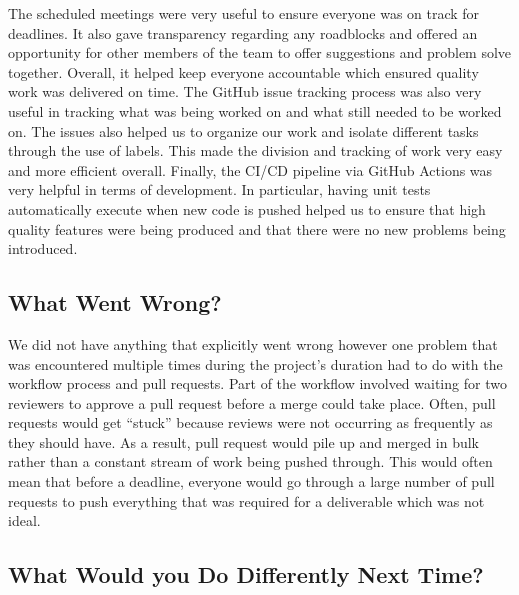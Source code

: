 \documentclass{article}
\begin{document}
The scheduled meetings were very useful to ensure everyone was on track for deadlines.
It also gave transparency regarding any roadblocks and offered an opportunity for other members
of the team to offer suggestions and problem solve together. Overall, it helped keep everyone accountable
which ensured quality work was delivered on time. The GitHub issue tracking process was also very
useful in tracking what was being worked on and what still needed to be worked on. The issues also helped us to organize
our work and isolate different tasks through the use of labels. This made the division and tracking of work
very easy and more efficient overall. Finally, the CI/CD pipeline via GitHub Actions was very helpful in terms
of development. In particular, having unit tests automatically execute when new code is
pushed helped us to ensure that high quality features were being produced and that there were no new problems being introduced.

\subsection{What Went Wrong?}


We did not have anything that explicitly went wrong however one problem that was encountered multiple times during
the project's duration had to do with the workflow process and pull requests. Part of the workflow
involved waiting for two reviewers to approve a pull request before a merge could take place. Often,
pull requests would get ``stuck'' because reviews were not occurring as frequently
as they should have. As a result, pull request would pile up and merged in bulk rather than a constant stream
of work being pushed through. This would often mean that before a deadline, everyone would go through
a large number of pull requests to push everything that was required for a deliverable which was not ideal.

\subsection{What Would you Do Differently Next Time?}

\end{document}
